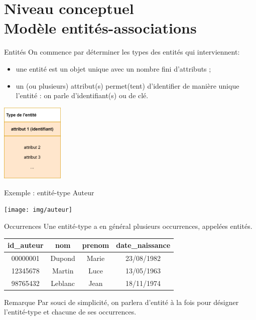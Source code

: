 \documentclass[10pt]{nsibeamer}
\begin{document}
\section{Niveau conceptuel\\ Modèle entités-associations}
\begin{frame}{Entités}
On commence par déterminer les types des entités qui interviennent:\pause
\begin{itemize}
	\item	une \alert{entité} est un objet unique avec un nombre fini d'attributs ;\pause
	\item	un (ou plusieurs) attribut(s) permet(tent) d'identifier de manière unique l'entité : on parle d'\alert{identifian}t(s) ou de clé.\pause
\end{itemize}
\begin{center}
\includegraphics[width=3cm]{img/entité}
\end{center}
\end{frame}
\begin{frame}{Exemple : entité-type Auteur}
\begin{center}
\texttt{[image: img/auteur]}
\end{center}
\end{frame}
\begin{frame}{Occurrences}
	Une entité-type a en général plusieurs occurrences, appelées entités.\\\pause

    \begin{center}
        \begin{tabular}{cccc}
        \hline
        \rowcolor{UGLiRed!25}
        \textbf{id\_auteur }& \textbf{nom} & \textbf{prenom}&\textbf{date\_naissance}\\\hline
        \rowcolor{UGLiBlue!7}00000001 & Dupond & Marie& 23/08/1982\\
        \rowcolor{UGLiRed!7}12345678 & Martin & Luce& 13/05/1963\\
        \rowcolor{UGLiBlue!7}98765432 & Leblanc & Jean& 18/11/1974\\
         \hline
        \end{tabular}
    \end{center}\pause
    \begin{alertblock}{Remarque}
    	Par souci de simplicité, on parlera d'entité à la fois pour désigner l'entité-type et chacune de ses occurrences.
    \end{alertblock}
\end{frame}
\end{document}
